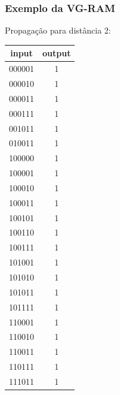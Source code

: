 \documentclass{beamer}
\begin{document}
\begin{frame}
    \frametitle{Exemplo da VG-RAM}
    Propagação para distância 2:
    \begin{table}
        \tiny
        \centering
        \begin{tabular}{|c|c|}
            \hline
            input &   output\\
            \hline
            000001 & \alert 1\\
            \hline
            000010 & \alert 1\\
            \hline
            000011 &        1\\
            \hline
            000111 & \alert 1\\
            \hline
            001011 & \alert 1\\
            \hline
            010011 & \alert 1\\
            \hline
            100000 & \alert 1\\
            \hline
            100001 &        1\\
            \hline
            100010 &        1\\
            \hline
            100011 &        1\\
            \hline
            100101 & \alert 1\\
            \hline
            100110 & \alert 1\\
            \hline
            100111 &        1\\
            \hline
            101001 & \alert 1\\
            \hline
            101010 & \alert 1\\
            \hline
            101011 &        1\\
            \hline
            101111 & \alert 1\\
            \hline
            110001 & \alert 1\\
            \hline
            110010 & \alert 1\\
            \hline
            110011 &        1\\
            \hline
            110111 & \alert 1\\
            \hline
            111011 & \alert 1\\
            \hline
        \end{tabular}
    \end{table}
\end{frame}
\end{document}
